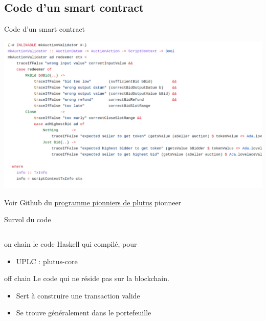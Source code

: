 \documentclass[presentation]{beamer}
\begin{document}
\subsection{Code d'un smart contract}
\label{sec:org96aa904}
\begin{frame}[label={sec:orgfbad046}]{Code d'un smart contract}
\begin{center}
\includegraphics[height=.55\textheight]{Images/smart-contract-plutus.png}
\end{center}

Voir Github du \href{https://github.com/input-output-hk/plutus-pioneer-program/blob/main/code/week01/src/Week01/EnglishAuction.hs}{programme pionniers de plutus} pionneer
\end{frame}
\begin{frame}[label={sec:org7b622f1}]{Survol du code}
\begin{columns}
\begin{column}{0.5\columnwidth}
\begin{block}{}
\begin{block}{on chain}
le code Haskell qui compilé, pour
\begin{itemize}
\item UPLC : plutus-core
\end{itemize}
\end{block}
\begin{block}{off chain}
Le code qui ne réside pas sur la blockchain.
\begin{itemize}
\item Sert à construire une transaction valide
\item Se trouve généralement dans le portefeuille
\end{itemize}
\end{block}
\end{block}
\end{column}
\end{columns}
\end{frame}
\end{document}

